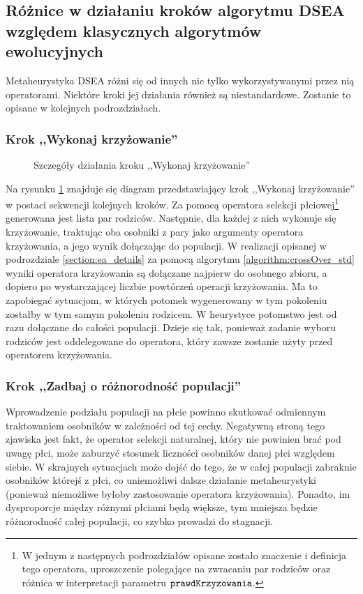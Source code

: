 \documentclass[./FM_mgr.tex]{subfiles}
\begin{document}
\subsection{Różnice w działaniu kroków algorytmu DSEA względem klasycznych algorytmów ewolucyjnych}

Metaheurystyka DSEA różni się od innych nie tylko wykorzystywanymi przez nią operatorami.
Niektóre kroki jej działania również są niestandardowe.
Zostanie to opisane w kolejnych podrozdziałach.

\subsubsection{Krok ,,Wykonaj krzyżowanie''} \label{subsubsection:my_crossover}

\begin{figure}[H]
	\caption{Szczegóły działania kroku ,,Wykonaj krzyżowanie'' \label{figure:my_crossover}}
\end{figure}

Na rysunku \ref{figure:my_crossover} znajduje się diagram przedstawiający krok ,,Wykonaj krzyżowanie'' w postaci sekwencji kolejnych kroków. Za pomocą operatora selekcji płciowej\footnote{
	W jednym z następnych podrozdziałów opisane zostało znaczenie i definicja tego operatora, uproszczenie polegające na zwracaniu par rodziców oraz różnica w interpretacji parametru $\mathtt{prawdKrzyzowania}$. 
} generowana jest lista par rodziców. 
Następnie, dla każdej z nich wykonuje się krzyżowanie, traktując oba osobniki z pary jako argumenty operatora krzyżowania, a jego wynik dołączając do populacji. 
W  realizacji opisanej w podrozdziale \ref{section:ea_details} za pomocą algorytmu \ref{algorithm:crossOver_std} wyniki operatora krzyżowania są dołączane najpierw do osobnego zbioru, a dopiero po wystarczającej liczbie powtórzeń operacji krzyżowania.
Ma to zapobiegać sytuacjom, w których potomek wygenerowany w tym pokoleniu zostałby w tym samym pokoleniu rodzicem.
W heurystyce potomstwo jest od razu dołączane do całości populacji.
Dzieje się tak, ponieważ zadanie wyboru rodziców jest oddelegowane do operatora, który zawsze zostanie użyty przed operatorem krzyżowania.

\subsubsection{Krok ,,Zadbaj o różnorodność populacji''} \label{subsubsection:fixing}

Wprowadzenie podziału populacji na płcie powinno skutkować odmiennym traktowaniem osobników w zależności od tej cechy. 
Negatywną stroną tego zjawiska jest fakt, że operator selekcji naturalnej, który nie powinien brać pod uwagę płci, może zaburzyć stosunek liczności osobników danej płci względem siebie. 
W skrajnych sytuacjach może dojść do tego, że w całej populacji zabraknie osobników którejś z płci, co uniemożliwi dalsze działanie metaheurystyki (ponieważ niemożliwe byłoby zastosowanie operatora krzyżowania). 
Ponadto, im dysproporcje między różnymi płciami będą większe, tym mniejsza będzie różnorodność całej populacji, co szybko prowadzi do stagnacji.
\end{document}
